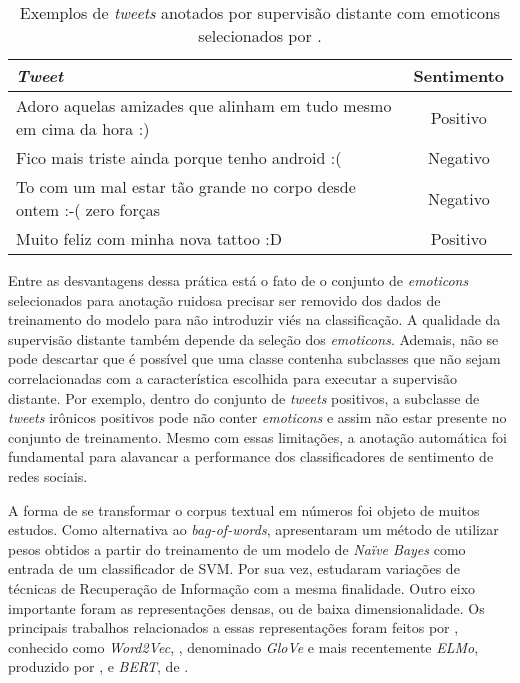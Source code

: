 \begin{table}[h]
    \begin{center}
        \begin{tabular}{| p{10cm} | c |}
        \hline
        \textbf{\textit{Tweet}} & \textbf{Sentimento} \\ \hline
        Adoro aquelas amizades que alinham em tudo mesmo em cima da hora :) & Positivo \\ \hline
        Fico mais triste ainda porque tenho android :( & Negativo\\ \hline
        To com um mal estar tão grande no corpo desde ontem :-( zero forças & Negativo\\ \hline
        Muito feliz com minha nova tattoo :D & Positivo \\ \hline
        \end{tabular}
        \caption{Exemplos de \textit{tweets} anotados por supervisão distante
        com emoticons selecionados por \citet{go09}.}
        \label{tab:supervision_tweets}
    \end{center}
\end{table}

Entre as desvantagens dessa prática está o fato de o conjunto de
\textit{emoticons} selecionados para anotação ruidosa precisar ser removido
dos dados de treinamento do modelo para não introduzir viés na classificação.
A qualidade da supervisão distante também depende da seleção dos
\textit{emoticons}.
Ademais, não se pode descartar que é possível que uma classe contenha subclasses que
não sejam correlacionadas com a característica escolhida para executar a
supervisão distante.
Por exemplo, dentro do conjunto de \textit{tweets} positivos, a subclasse de
\textit{tweets} irônicos positivos pode não conter \textit{emoticons} e assim
não estar presente no conjunto de treinamento.
Mesmo com essas limitações, a anotação automática foi fundamental para alavancar
a performance dos classificadores de sentimento de redes sociais.


A forma de se transformar o corpus textual em números foi objeto de muitos
estudos.
Como alternativa ao \textit{bag-of-words}, \citet{wang12} apresentaram um método
de utilizar pesos obtidos a partir do treinamento de um modelo de
\textit{Naïve Bayes} como entrada de um classificador de SVM.
Por sua vez, \citet{paltoglou10} estudaram variações de técnicas de Recuperação
de Informação com a mesma finalidade.
Outro eixo importante foram as representações densas, ou de baixa
dimensionalidade.
Os principais trabalhos relacionados a essas representações foram feitos por
\citet{mikolov13}, conhecido como \textit{Word2Vec}, \citet{pennington14},
denominado \textit{GloVe} e mais recentemente \textit{ELMo}, produzido por
\citet{peters18}, e \textit{BERT}, de \citet{devlin18}.


